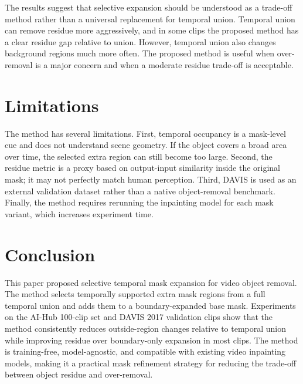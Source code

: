 \documentclass[nouppercase]{kaia}
\begin{document}
The results suggest that selective expansion should be understood as a trade-off method rather than a universal replacement for temporal union. Temporal union can remove residue more aggressively, and in some clips the proposed method has a clear residue gap relative to union. However, temporal union also changes background regions much more often. The proposed method is useful when over-removal is a major concern and when a moderate residue trade-off is acceptable.

\section{Limitations}
The method has several limitations. First, temporal occupancy is a mask-level cue and does not understand scene geometry. If the object covers a broad area over time, the selected extra region can still become too large. Second, the residue metric is a proxy based on output-input similarity inside the original mask; it may not perfectly match human perception. Third, DAVIS is used as an external validation dataset rather than a native object-removal benchmark. Finally, the method requires rerunning the inpainting model for each mask variant, which increases experiment time.

\section{Conclusion}
This paper proposed selective temporal mask expansion for video object removal. The method selects temporally supported extra mask regions from a full temporal union and adds them to a boundary-expanded base mask. Experiments on the AI-Hub 100-clip set and DAVIS 2017 validation clips show that the method consistently reduces outside-region changes relative to temporal union while improving residue over boundary-only expansion in most clips. The method is training-free, model-agnostic, and compatible with existing video inpainting models, making it a practical mask refinement strategy for reducing the trade-off between object residue and over-removal.



\newpage
\newpage
\end{document}
